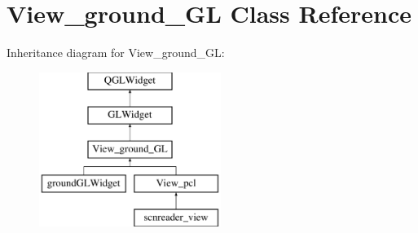 \hypertarget{classView__ground__GL}{\section{View\-\_\-ground\-\_\-\-G\-L Class Reference}
\label{classView__ground__GL}
}
Inheritance diagram for View\-\_\-ground\-\_\-\-G\-L\-:\begin{figure}[H]
\begin{center}
\leavevmode
\includegraphics[height=5.000000cm]{classView__ground__GL}
\end{center}
\end{figure}
